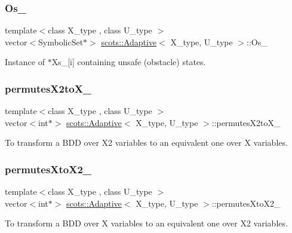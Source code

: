 \subsubsection{\texorpdfstring{Os\+\_\+}{Os\_}}
{\footnotesize\ttfamily template$<$class X\+\_\+type , class U\+\_\+type $>$ \\
vector$<$Symbolic\+Set$\ast$$>$ \hyperlink{classscots_1_1Adaptive}{scots\+::\+Adaptive}$<$ X\+\_\+type, U\+\_\+type $>$\+::Os\+\_\+}

Instance of $\ast$\+Xs\+\_\+\mbox{[}i\mbox{]} containing unsafe (obstacle) states. \mbox{\label{classscots_1_1Adaptive_a88edb6662310c07120d07c9dff968ddc}} 
\subsubsection{\texorpdfstring{permutes\+X2to\+X\+\_\+}{permutesX2toX\_}}
{\footnotesize\ttfamily template$<$class X\+\_\+type , class U\+\_\+type $>$ \\
vector$<$int$\ast$$>$ \hyperlink{classscots_1_1Adaptive}{scots\+::\+Adaptive}$<$ X\+\_\+type, U\+\_\+type $>$\+::permutes\+X2to\+X\+\_\+}

To transform a B\+DD over X2 variables to an equivalent one over X variables. \mbox{\label{classscots_1_1Adaptive_ae954d4d3177bdc4093530e254ace2b34}} 
\subsubsection{\texorpdfstring{permutes\+Xto\+X2\+\_\+}{permutesXtoX2\_}}
{\footnotesize\ttfamily template$<$class X\+\_\+type , class U\+\_\+type $>$ \\
vector$<$int$\ast$$>$ \hyperlink{classscots_1_1Adaptive}{scots\+::\+Adaptive}$<$ X\+\_\+type, U\+\_\+type $>$\+::permutes\+Xto\+X2\+\_\+}

To transform a B\+DD over X variables to an equivalent one over X2 variables. \mbox{\label{classscots_1_1Adaptive_a8c2a7e89feeb75f0b51fdf9c8d1359e7}} 
